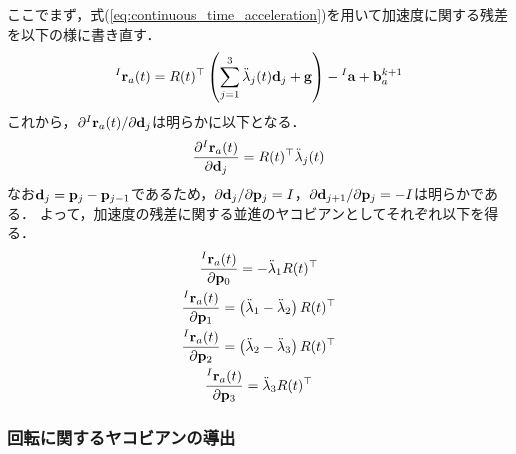 ここでまず，式(\ref{eq:continuous_time_acceleration})を用いて加速度に関する残差を以下の様に書き直す．
%
\begin{align}
  {}^{I}{\bf r}_{a}(t) = R(t)^{\top} \left( \sum_{j=1}^{3} \ddot{ \lambda }_{j}(t) {\bf d}_{j} + {\bf g} \right) - {}^{I}{\bf a} + {\bf b}_{a}^{k+1}
\end{align}
%
これから，$\partial {}^{I}{\bf r}_{a}(t) / \partial {\bf d}_{j}$は明らかに以下となる．
%
\begin{align}
  \frac{ \partial {}^{I}{\bf r}_{a}(t) }{ \partial {\bf d}_{j} } = R(t)^{\top} \ddot{ \lambda }_{j}(t)
\end{align}
%
なお${\bf d}_{j} = {\bf p}_{j} - {\bf p}_{j-1}$であるため，$\partial {\bf d}_{j} / \partial {\bf p}_{j} = I$，$\partial {\bf d}_{j+1} / \partial {\bf p}_{j} = -I$は明らかである．
よって，加速度の残差に関する並進のヤコビアンとしてそれぞれ以下を得る．
%
\begin{align}
  \begin{gathered}
    \frac{ {}^{I}{\bf r}_{a}(t) }{ \partial {\bf p}_{0} }
    =
    -\ddot{ \lambda }_{1} R(t)^{\top} \\
    \frac{ {}^{I}{\bf r}_{a}(t) }{ \partial {\bf p}_{1} }
    =
    \left( \ddot{ \lambda }_{1} - \ddot{ \lambda }_{2} \right) R(t)^{\top} \\
    \frac{ {}^{I}{\bf r}_{a}(t) }{ \partial {\bf p}_{2} }
    =
    \left( \ddot{ \lambda }_{2} - \ddot{ \lambda }_{3} \right) R(t)^{\top} \\
    \frac{ {}^{I}{\bf r}_{a}(t) }{ \partial {\bf p}_{3} }
    =
    \ddot{ \lambda }_{3} R(t)^{\top} \\
  \end{gathered}
\end{align}








\subsubsection{回転に関するヤコビアンの導出}

